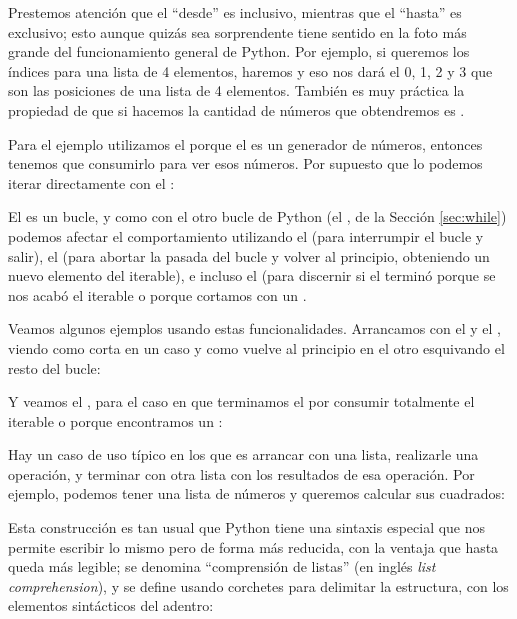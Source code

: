 
Prestemos atención que el ``desde'' es inclusivo, mientras que el ``hasta'' es exclusivo; esto aunque quizás sea sorprendente tiene sentido en la foto más grande del funcionamiento general de Python. Por ejemplo, si queremos los índices para una lista de 4 elementos, haremos  y eso nos dará el 0, 1, 2 y 3 que son las posiciones de una lista de 4 elementos. También es muy práctica la propiedad de que si hacemos  la cantidad de números que obtendremos es .

Para el ejemplo utilizamos el  porque el  es un generador de números, entonces tenemos que consumirlo para ver esos números. Por supuesto que lo podemos iterar directamente con el :


El  es un bucle, y como con el otro bucle de Python (el , de la Sección \ref{sec:while}) podemos afectar el comportamiento utilizando el  (para interrumpir el bucle y salir), el  (para abortar la pasada del bucle y volver al principio, obteniendo un nuevo elemento del iterable), e incluso el  (para discernir si el  terminó porque se nos acabó el iterable o porque cortamos con un .

Veamos algunos ejemplos usando estas funcionalidades. Arrancamos con el  y el , viendo como corta en un caso y como vuelve al principio en el otro esquivando el resto del bucle:


Y veamos el , para el caso en que terminamos el  por consumir totalmente el iterable o porque encontramos un :


Hay un caso de uso típico en los  que es arrancar con una lista, realizarle una operación, y terminar con otra lista con los resultados de esa operación. Por ejemplo, podemos tener una lista de números y queremos calcular sus cuadrados:


Esta construcción es tan usual que Python tiene una sintaxis especial que nos permite escribir lo mismo pero de forma más reducida, con la ventaja que hasta queda más legible; se denomina ``comprensión de listas'' (en inglés \textit{list comprehension}), y se define usando corchetes para delimitar la estructura, con los elementos sintácticos del  adentro:

